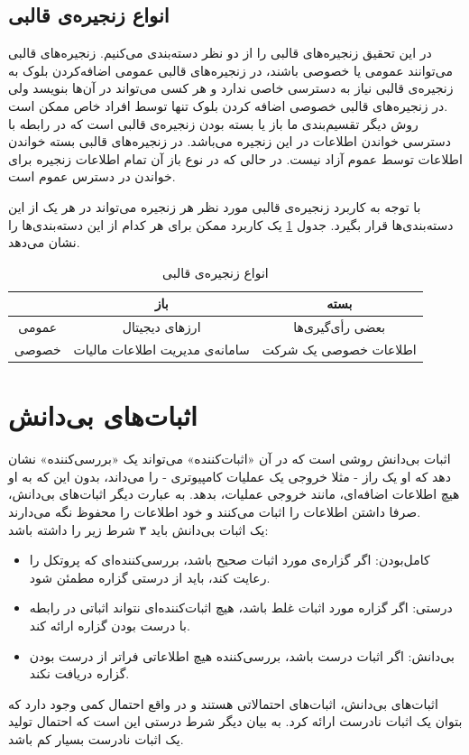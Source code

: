  \subsection{انواع زنجیره‌ی قالبی}
 در این تحقیق زنجیره‌های قالبی‌ را از دو نظر دسته‌‌بندی می‌کنیم. زنجیره‌های قالبی‌ می‌توانند عمومی یا خصوصی باشند، در زنجیره‌های قالبی‌ عمومی اضافه‌کردن بلوک به زنجیره‌ی قالبی نیاز به دسترسی خاصی ندارد و هر کسی می‌تواند در آن‌ها بنویسد ولی در زنجیره‌های قالبی خصوصی اضافه کردن بلوک تنها توسط افراد خاص ممکن است. 
 \\
 روش دیگر تقسیم‌بندی ما باز یا بسته بودن زنجیره‌ی قالبی است که در رابطه با دسترسی خواندن اطلاعات در این زنجیره می‌باشد. در زنجیره‌های قالبی‌ بسته خواندن اطلاعات توسط عموم آزاد نیست. در حالی که در نوع باز آن تمام اطلاعات زنجیره برای خواندن در دسترس عموم است.
\par
با توجه به کاربرد زنجیره‌ی قالبی مورد نظر هر زنجیره‌ می‌تواند در هر یک از این دسته‌بندی‌ها قرار بگیرد. جدول  \ref{tab:tch} یک کاربرد ممکن برای هر کدام از این دسته‌بندی‌ها را نشان می‌دهد.

\begin{table}[h]
	\begin{center}
		\caption{انواع زنجیره‌ی قالبی}
		\begin{tabular}{|c|c|c|}
			\hline
			& باز & بسته \\
			\hline
			عمومی & ارز‌های دیجیتال & بعضی رأی‌گیری‌ها \\
			\hline
			خصوصی & سامانه‌ی مدیریت اطلاعات مالیات & اطلاعات خصوصی یک شرکت \\
			\hline

		\end{tabular}
		\label{tab:tch}
	\end{center}
\end{table}


 
 
\section{اثبات‌های بی‌دانش}
اثبات‌ بی‌دانش 
روشی است که در آن «اثبات‌کننده» می‌تواند یک «بررسی‌کننده» نشان دهد که او یک راز - مثلا خروجی یک عملیات کامپیوتری - را می‌داند، بدون این که به او هیچ اطلاعات اضافه‌ای، مانند خروجی عملیات، بدهد. به عبارت دیگر اثبات‌های بی‌دانش، صرفا داشتن اطلاعات را اثبات می‌کنند و خود اطلاعات را محفوظ نگه‌ می‌دارند.
\\
یک اثبات بی‌دانش باید ۳ شرط زیر را داشته باشد:
\begin{itemize}
	\item
	کامل‌بودن: اگر گزاره‌ی مورد اثبات صحیح باشد، بررسی‌کننده‌ای که پروتکل را رعایت کند، باید از درستی گزاره مطمئن شود.
	\item 
	درستی: اگر گزاره مورد اثبات غلط باشد، هیچ اثبات‌کننده‌ای نتواند اثباتی در رابطه با درست بودن گزاره ارائه کند.
	\item 
	بی‌دانش: اگر اثبات درست باشد، بررسی‌کننده هیچ اطلاعاتی فراتر از درست بودن گزاره دریافت نکند.
\end{itemize}
اثبات‌های بی‌دانش، اثبات‌های احتمالاتی هستند و در واقع احتمال کمی وجود دارد که بتوان یک اثبات نادرست ارائه کرد. به بیان دیگر شرط درستی این است که احتمال تولید یک اثبات نادرست بسیار کم باشد. 
